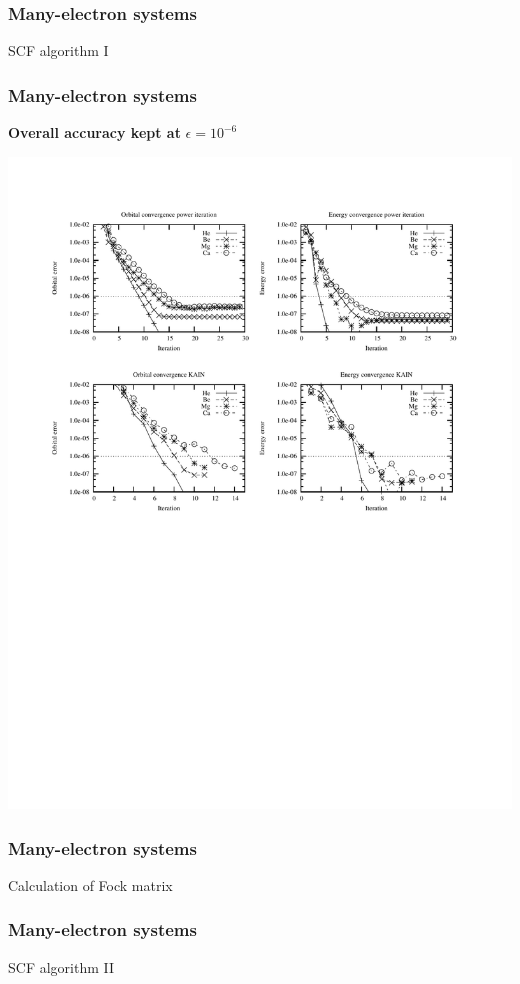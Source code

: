 \documentclass[mathserif, 10pt]{beamer}
\begin{document}
\begin{frame}
    \frametitle{Many-electron systems}
    SCF algorithm I
\end{frame}

\begin{frame}
    \frametitle{Many-electron systems}
    \centering
    \textbf{Overall accuracy kept at} $\epsilon = 10^{-6}$
    \begin{center}
	\includegraphics[scale=0.8, clip, viewport = 50 550 300 740]{figures/accuracy.pdf}
    \end{center}
\end{frame}

\begin{frame}
    \frametitle{Many-electron systems}
    Calculation of Fock matrix
\end{frame}

\begin{frame}
    \frametitle{Many-electron systems}
    SCF algorithm II
\end{frame}
\end{document}

